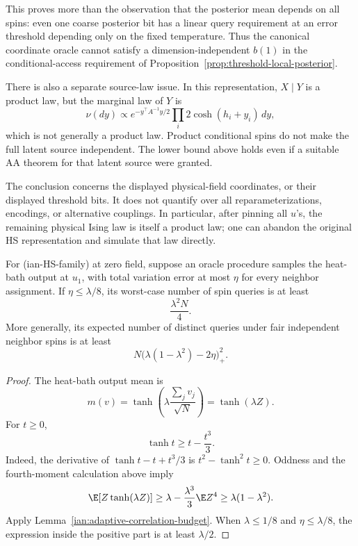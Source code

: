 This proves more than the observation that the posterior mean depends
on all spins: even one coarse posterior bit has a linear query
requirement at an error threshold depending only on the fixed
temperature. Thus the canonical coordinate oracle cannot satisfy a
dimension-independent \(b(1)\) in the conditional-access requirement
of Proposition~\ref{prop:threshold-local-posterior}.

There is also a separate source-law issue. In this representation,
\(X\mid Y\) is a product law, but the marginal law of \(Y\) is
\[
 \nu(dy)\propto
 e^{-y^\top A^{-1}y/2}\prod_i2\cosh(h_i+y_i)\,dy,
\]
which is not generally a product law. Product conditional spins do not
make the full latent source independent. The lower bound above holds
even if a suitable AA theorem for that latent source were granted.

The conclusion concerns the displayed physical-field coordinates, or
their displayed threshold bits. It does not quantify over all
reparameterizations, encodings, or alternative couplings. In
particular, after pinning all \(u\)'s, the remaining physical Ising law
is itself a product law; one can abandon the original HS representation
and simulate that law directly.

\begin{proposition}
\label{ian:heatbath-linear-lower-bound}
For (ian-HS-family) at zero field, suppose an oracle procedure samples
the heat-bath output at \(u_1\), with total variation error at most
\(\eta\) for every neighbor assignment. If \(\eta\le\lambda/8\), its
worst-case number of spin queries is at least
\[
 \frac{\lambda^2N}{4}.
 \tag{ian-HBL}
\]
More generally, its expected number of distinct queries under fair
independent neighbor spins is at least
\[
 N\bigl(\lambda(1-\lambda^2)-2\eta\bigr)_+^2.
\]
\end{proposition}

\begin{proof}
The heat-bath output mean is
\[
 m(v)=\tanh\left(\lambda\frac{\sum_jv_j}{\sqrt N}\right)
      =\tanh(\lambda Z).
\]
For \(t\ge0\),
\[
 \tanh t\ge t-\frac{t^3}{3}.
\]
Indeed, the derivative of
\(\tanh t-t+t^3/3\) is \(t^2-\tanh^2t\ge0\).
Oddness and the fourth-moment calculation above imply
\[
 \E[Z\tanh(\lambda Z)]
 \ge\lambda-\frac{\lambda^3}{3}\E Z^4
 \ge\lambda(1-\lambda^2).
\]
Apply Lemma~\ref{ian:adaptive-correlation-budget}. When
\(\lambda\le1/8\) and \(\eta\le\lambda/8\), the expression inside the
positive part is at least \(\lambda/2\).
\end{proof}


